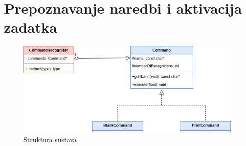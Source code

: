 \section{Prepoznavanje naredbi i aktivacija zadatka}

\begin{figure}[htb]
    \centering
    \includegraphics[width=0.8\linewidth]{Chapters/struktura_sustava/prepoznavanje_naredbi/commands.png} 
    \caption{Struktura sustava \cite{flowchart}}
    \label{pic:uml}
\end{figure}

